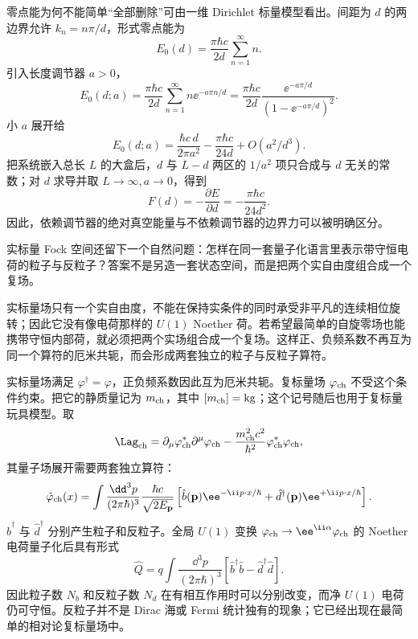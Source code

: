 \begin{exbox}[一维 Casimir 模型]
零点能为何不能简单“全部删除”可由一维 Dirichlet 标量模型看出。间距为 $d$ 的两边界允许 $k_n=n\pi/d$，形式零点能为
\begin{equation*}
E_0(d)=\frac{\pi\hbar c}{2d}\sum_{n=1}^\infty n.
\end{equation*}
引入长度调节器 $a>0$，
\begin{equation*}
E_0(d;a)=\frac{\pi\hbar c}{2d}
\sum_{n=1}^\infty n \ee^{-a\pi n/d}
=\frac{\pi\hbar c}{2d}
\frac{\ee^{-a\pi/d}}{(1-\ee^{-a\pi/d})^2}.
\end{equation*}
小 $a$ 展开给
\begin{equation*}
E_0(d;a)=\frac{\hbar c\,d}{2\pi a^2}-\frac{\pi\hbar c}{24d}+O(a^2/d^3).
\end{equation*}
把系统嵌入总长 $L$ 的大盒后，$d$ 与 $L-d$ 两区的 $1/a^2$ 项只合成与 $d$ 无关的常数；对 $d$ 求导并取 $L\to\infty,a\to0$，得到
\begin{equation*}
F(d)=-\frac{\partial E}{\partial d}=-\frac{\pi\hbar c}{24d^2}.
\end{equation*}
因此，依赖调节器的绝对真空能量与不依赖调节器的边界力可以被明确区分。
\end{exbox}

实标量 Fock 空间还留下一个自然问题：怎样在同一套量子化语言里表示带守恒电荷的粒子与反粒子？答案不是另造一套状态空间，而是把两个实自由度组合成一个复场。

实标量场只有一个实自由度，不能在保持实条件的同时承受非平凡的连续相位旋转；因此它没有像电荷那样的 $U(1)$ Noether 荷。若希望最简单的自旋零场也能携带守恒内部荷，就必须把两个实场组合成一个复场。这样正、负频系数不再互为同一个算符的厄米共轭，而会形成两套独立的粒子与反粒子算符。

实标量场满足 $\varphi^\dagger=\varphi$，正负频系数因此互为厄米共轭。复标量场 $\varphi_{\rm ch}$ 不受这个条件约束。把它的静质量记为 $m_{\rm ch}$，其中 $[m_{\rm ch}]=\mathrm{kg}$；这个记号随后也用于复标量玩具模型。取
\begin{equation*}
 \Lag_{\rm ch}
 =\partial_\mu\varphi_{\rm ch}^*\partial^\mu\varphi_{\rm ch}
 -\frac{m_{\rm ch}^2c^2}{\hbar^2}\varphi_{\rm ch}^*\varphi_{\rm ch},
\end{equation*}
其量子场展开需要两套独立算符：
\begin{equation}
 \hat\varphi_{\rm ch}(x)=
 \int\frac{\dd^3 p}{(2\pi\hbar)^3}
 \frac{\hbar c}{\sqrt{2E_{\mathbf p}}}
 \left[
 \hat b(\mathbf p)\ee^{-\ii p\cdot x/\hbar}
 +\hat d^\dagger(\mathbf p)\ee^{+\ii p\cdot x/\hbar}
 \right].
 \label{eq:complex-scalar-exp-r2}
\end{equation}
$\hat b^\dagger$ 与 $\hat d^\dagger$ 分别产生粒子和反粒子。全局 $U(1)$ 变换 $\varphi_{\rm ch}\to \ee^{\ii\alpha}\varphi_{\rm ch}$ 的 Noether 电荷量子化后具有形式
\begin{equation}
 \hat Q=q\int\frac{\dd^3 p}{(2\pi\hbar)^3}
 \left[
 \hat b^\dagger\hat b-\hat d^\dagger\hat d
 \right].
 \label{eq:complex-scalar-charge-r2}
\end{equation}
因此粒子数 $N_b$ 和反粒子数 $N_d$ 在有相互作用时可以分别改变，而净 $U(1)$ 电荷仍可守恒。反粒子并不是 Dirac 海或 Fermi 统计独有的现象；它已经出现在最简单的相对论复标量场中。


